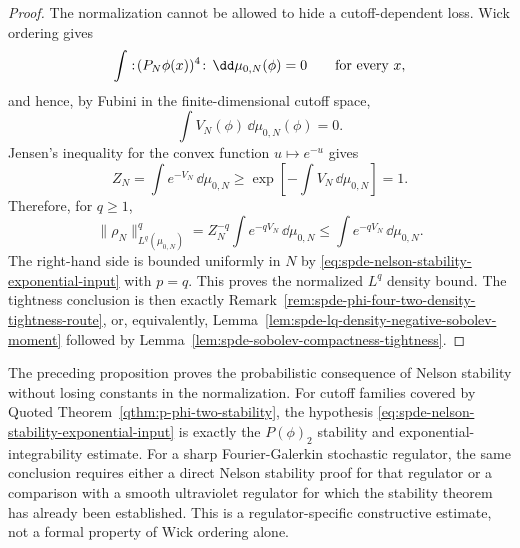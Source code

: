 \begin{proof}
The normalization cannot be allowed to hide a cutoff-dependent loss.  Wick
ordering gives
\[
  \int :\!(P_N\phi(x))^4\!:\,\dd\mu_{0,N}(\phi)=0
  \qquad\hbox{for every }x,
\]
and hence, by Fubini in the finite-dimensional cutoff space,
\[
  \int V_N(\phi)\,\dd\mu_{0,N}(\phi)=0 .
\]
Jensen's inequality for the convex function \(u\mapsto e^{-u}\) gives
\begin{equation}
  Z_N
  =
  \int e^{-V_N}\,\dd\mu_{0,N}
  \geq
  \exp\!\left[-\int V_N\,\dd\mu_{0,N}\right]
  =1 .
  \label{eq:spde-wick-quartic-partition-lower-bound}
\end{equation}
Therefore, for \(q\geq1\),
\[
  \|\rho_N\|_{L^q(\mu_{0,N})}^q
  =
  Z_N^{-q}
  \int e^{-qV_N}\,\dd\mu_{0,N}
  \leq
  \int e^{-qV_N}\,\dd\mu_{0,N}.
\]
The right-hand side is bounded uniformly in \(N\) by
\eqref{eq:spde-nelson-stability-exponential-input} with \(p=q\).  This
proves the normalized \(L^q\) density bound.  The tightness conclusion is
then exactly
Remark~\ref{rem:spde-phi-four-two-density-tightness-route}, or,
equivalently, Lemma~\ref{lem:spde-lq-density-negative-sobolev-moment}
followed by Lemma~\ref{lem:spde-sobolev-compactness-tightness}.
\end{proof}

The preceding proposition proves the probabilistic consequence of Nelson
stability without losing constants in the normalization.  For cutoff
families covered by
Quoted Theorem~\ref{qthm:p-phi-two-stability}, the hypothesis
\eqref{eq:spde-nelson-stability-exponential-input} is exactly the
\(P(\phi)_2\) stability and exponential-integrability estimate.  For a
sharp Fourier-Galerkin stochastic regulator, the same conclusion requires
either a direct Nelson stability proof for that regulator or a comparison
with a smooth ultraviolet regulator for which the stability theorem has
already been established.  This is a regulator-specific constructive
estimate, not a formal property of Wick ordering alone.

